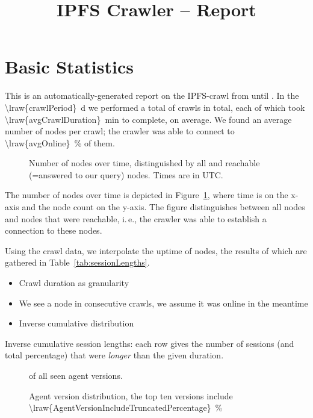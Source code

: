 \documentclass[10pt]{article}
\title{IPFS Crawler -- Report}
\makeatletter
\newcommand*{\ie}{i.\,e.\@\xspace}
\makeatother
\begin{document}
\maketitle


\section{Basic Statistics}
\label{sec:basic}

This is an automatically-generated report on the IPFS-crawl from until .
In the \SI{\lraw{crawlPeriod}}{\day} we performed a total of  crawls in total, each of which took \SI{\lraw{avgCrawlDuration}}{\minute} to complete, on average.
We found an average number of  nodes per crawl; the crawler was able to connect to \SI{\lraw{avgOnline}}{\percent} of them.
%
\begin{figure}
  
  \caption{Number of nodes over time, distinguished by all and reachable (=answered to our query) nodes. Times are in UTC.}
  \label{fig:num_nodes}
\end{figure}
%
The number of nodes over time is depicted in Figure~\ref{fig:num_nodes}, where time is on the x-axis and the node count on the y-axis.
The figure distinguishes between all nodes and nodes that were reachable, \ie, the crawler was able to establish a connection to these nodes.

Using the crawl data, we interpolate the uptime of nodes, the results of which are gathered in Table~\ref{tab:sessionLengths}.
\begin{itemize}
  \item Crawl duration as granularity
  \item We see a node in consecutive crawls, we assume it was online in the meantime
  \item Inverse cumulative distribution
\end{itemize}
%
\begin{table}
  \center
  
  \caption{Inverse cumulative session lengths: each row gives the number of sessions (and total percentage) that were \emph{longer} than the given duration.}
  \label{tab:sessionLengths}
\end{table}
%
\begin{figure}
  
  \caption{Agent version distribution, the top ten versions include \SI{\lraw{AgentVersionIncludeTruncatedPercentage}}{\percent}} of all seen agent versions.
  \label{figs:agent_version_distribution}
\end{figure}
\end{document}
